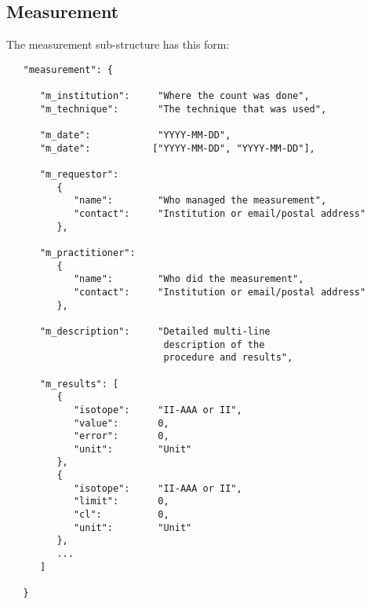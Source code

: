 \documentclass[11pt, letterpaper]{article}
\begin{document}
\newpage

\subsection{Measurement} %

The measurement sub-structure has this form:

\begin{small}
\begin{verbatim}
   "measurement": {
    
      "m_institution":     "Where the count was done",
      "m_technique":       "The technique that was used",
      
      "m_date":            "YYYY-MM-DD",
      "m_date":           ["YYYY-MM-DD", "YYYY-MM-DD"],
      
      "m_requestor":
         {
            "name":        "Who managed the measurement", 
            "contact":     "Institution or email/postal address"
         },
         
      "m_practitioner":
         {
            "name":        "Who did the measurement", 
            "contact":     "Institution or email/postal address"
         },
         
      "m_description":     "Detailed multi-line
                            description of the
                            procedure and results",
                            
      "m_results": [
         {
            "isotope":     "II-AAA or II",
            "value":       0,
            "error":       0,
            "unit":        "Unit"
         },
         {
            "isotope":     "II-AAA or II",
            "limit":       0,
            "cl":          0,
            "unit":        "Unit"
         },
         ...
      ]
        
   }
\end{verbatim}
\end{small}
\end{document}
